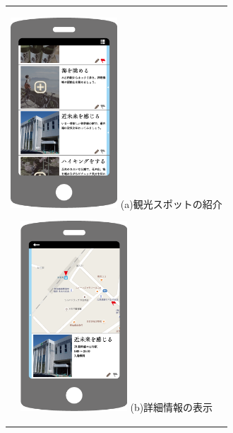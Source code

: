 \begin{figure}[htbp]
  \begin{center}
    \begin{tabular}{c}

      \begin{minipage}{0.33\hsize}
        \begin{center}
\includegraphics[width=4cm, bb=0 0 320 552]{appIdea1.png}
          \hspace{1cm} (a)観光スポットの紹介
        \end{center}
      \end{minipage}

      \begin{minipage}{0.33\hsize}
        \begin{center}
\includegraphics[width=4cm, bb=0 0 321 547]{appIdea2.png}
          \hspace{1cm} (b)詳細情報の表示
        \end{center}
      \end{minipage}


\end{tabular}
\end{center}
\end{figure}
